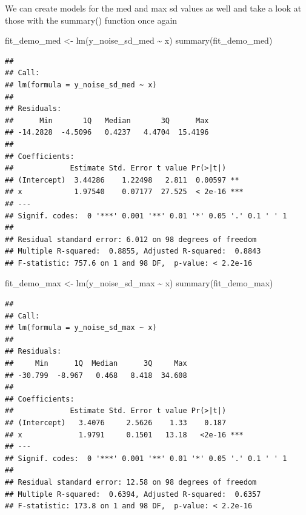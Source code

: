 \documentclass[
]{book}
\newenvironment{Shaded}{\begin{snugshade}}{\end{snugshade}}
\newcommand{\FunctionTok}[1]{\textcolor[rgb]{0.00,0.00,0.00}{#1}}
\newcommand{\NormalTok}[1]{#1}
\newcommand{\OtherTok}[1]{\textcolor[rgb]{0.56,0.35,0.01}{#1}}
\newcommand{\SpecialCharTok}[1]{\textcolor[rgb]{0.00,0.00,0.00}{#1}}
\begin{document}
We can create models for the med and max sd values as well and take a look at those with the summary() function once again

\begin{Shaded}
\begin{Highlighting}[]
\NormalTok{fit\_demo\_med }\OtherTok{\textless{}{-}} \FunctionTok{lm}\NormalTok{(y\_noise\_sd\_med }\SpecialCharTok{\textasciitilde{}}\NormalTok{ x)}
\FunctionTok{summary}\NormalTok{(fit\_demo\_med)}
\end{Highlighting}
\end{Shaded}

\begin{verbatim}
## 
## Call:
## lm(formula = y_noise_sd_med ~ x)
## 
## Residuals:
##      Min       1Q   Median       3Q      Max 
## -14.2828  -4.5096   0.4237   4.4704  15.4196 
## 
## Coefficients:
##             Estimate Std. Error t value Pr(>|t|)    
## (Intercept)  3.44286    1.22498   2.811  0.00597 ** 
## x            1.97540    0.07177  27.525  < 2e-16 ***
## ---
## Signif. codes:  0 '***' 0.001 '**' 0.01 '*' 0.05 '.' 0.1 ' ' 1
## 
## Residual standard error: 6.012 on 98 degrees of freedom
## Multiple R-squared:  0.8855, Adjusted R-squared:  0.8843 
## F-statistic: 757.6 on 1 and 98 DF,  p-value: < 2.2e-16
\end{verbatim}

\begin{Shaded}
\begin{Highlighting}[]
\NormalTok{fit\_demo\_max }\OtherTok{\textless{}{-}} \FunctionTok{lm}\NormalTok{(y\_noise\_sd\_max }\SpecialCharTok{\textasciitilde{}}\NormalTok{ x)}
\FunctionTok{summary}\NormalTok{(fit\_demo\_max)}
\end{Highlighting}
\end{Shaded}

\begin{verbatim}
## 
## Call:
## lm(formula = y_noise_sd_max ~ x)
## 
## Residuals:
##     Min      1Q  Median      3Q     Max 
## -30.799  -8.967   0.468   8.418  34.608 
## 
## Coefficients:
##             Estimate Std. Error t value Pr(>|t|)    
## (Intercept)   3.4076     2.5626    1.33    0.187    
## x             1.9791     0.1501   13.18   <2e-16 ***
## ---
## Signif. codes:  0 '***' 0.001 '**' 0.01 '*' 0.05 '.' 0.1 ' ' 1
## 
## Residual standard error: 12.58 on 98 degrees of freedom
## Multiple R-squared:  0.6394, Adjusted R-squared:  0.6357 
## F-statistic: 173.8 on 1 and 98 DF,  p-value: < 2.2e-16
\end{verbatim}
\end{document}
